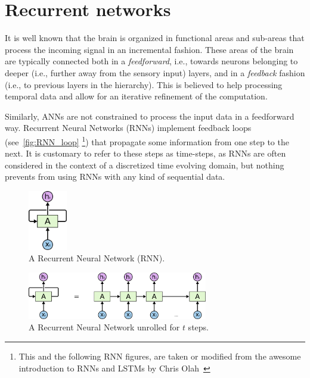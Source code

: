 \section{Recurrent networks}\label{sec:rnn}
%
It is well known that the brain is organized in functional areas and sub-areas
that process the incoming signal in an incremental fashion. These areas of the
brain are typically connected both in a \emph{feedforward}, i.e., towards
neurons belonging to deeper (i.e., further away from the sensory input) layers,
and in a \emph{feedback} fashion (i.e., to previous layers in the hierarchy).
This is believed to help processing temporal data and allow for an iterative
refinement of the computation.

Similarly, ANNs are not constrained to process the input data in a feedforward
way. Recurrent Neural Networks (RNNs) implement feedback loops
(see~\autoref{fig:RNN_loop} \footnote{This and the following RNN figures, are
    taken or modified from the awesome introduction to RNNs and LSTMs by Chris
    Olah~\citep{olah2015rnns}}) that propagate some information from one step to
the next. It is customary to refer to these steps as time-steps, as RNNs are
often considered in the context of a discretized time evolving domain, but
nothing prevents from using RNNs with any kind of sequential data.

\begin{figure}[t]
    \centering
    \includegraphics[width=0.15\textwidth]{pdf/RNN_loop.pdf}
    \caption{A Recurrent Neural Network (RNN).\label{fig:RNN_loop}}
\end{figure}

\begin{figure}[t!]
    \centering
    \includegraphics[width=0.7\textwidth]{pdf/RNN_unrolled.pdf}
    \caption{A Recurrent Neural Network unrolled for $t$%
             steps.\label{fig:RNN_unrolled}}
\end{figure}

